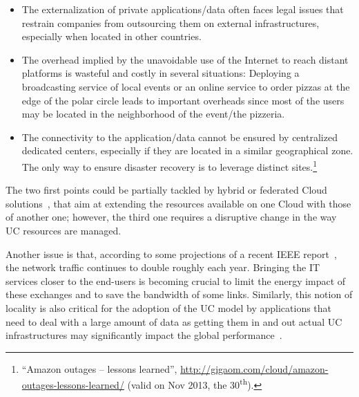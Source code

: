 \begin{itemize}
\item The externalization of private applications/data often faces legal issues
that restrain companies from outsourcing them on external infrastructures,
especially when located in other countries. 
\item The overhead implied by the unavoidable use of the Internet to reach
distant platforms is wasteful and costly in several situations: Deploying a
broadcasting service of local events or an online service to order pizzas at the
edge of the polar circle leads to important overheads since
most of the users may be located in the neighborhood of the
event/the pizzeria.  
\item The connectivity to the application/data cannot be ensured by centralized
dedicated centers, especially if they are located in a similar geographical
zone. The only way to ensure disaster recovery is to leverage distinct
sites.\footnote{``Amazon outages – lessons learned'',
\href{http://gigaom.com/cloud/amazon-outages-lessons-learned/}{http://gigaom.com/cloud/amazon-outages-lessons-learned/}
(valid on  Nov 2013, the 30\textsuperscript{th}).} 
\end{itemize}

The two first points could be partially tackled by hybrid or federated Cloud
solutions~\cite{armbrust:2010}, that aim at extending
the resources available on one Cloud with those of another one; however, the third 
one requires a disruptive change in
the way UC resources are managed.

Another issue is that, according to some projections of a recent IEEE
report~\cite{ieeenetreport:2012}, the network traffic continues to double roughly each
year. Bringing the IT services closer to the end-users is becoming crucial to limit
the energy impact of these exchanges and to save the bandwidth of some links. Similarly,
this notion of locality is also critical for the adoption of the UC model by applications
that need to deal with a large amount of data as getting them in and out actual UC
infrastructures may significantly impact the global performance~\cite{Fos11}. 

